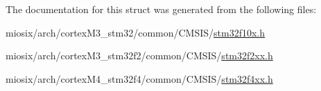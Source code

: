 The documentation for this struct was generated from the following files\-:\begin{DoxyCompactItemize}
\item 
miosix/arch/cortex\-M3\-\_\-stm32/common/\-C\-M\-S\-I\-S/\hyperlink{stm32f10x_8h}{stm32f10x.\-h}\item 
miosix/arch/cortex\-M3\-\_\-stm32f2/common/\-C\-M\-S\-I\-S/\hyperlink{stm32f2xx_8h}{stm32f2xx.\-h}\item 
miosix/arch/cortex\-M4\-\_\-stm32f4/common/\-C\-M\-S\-I\-S/\hyperlink{stm32f4xx_8h}{stm32f4xx.\-h}\end{DoxyCompactItemize}
